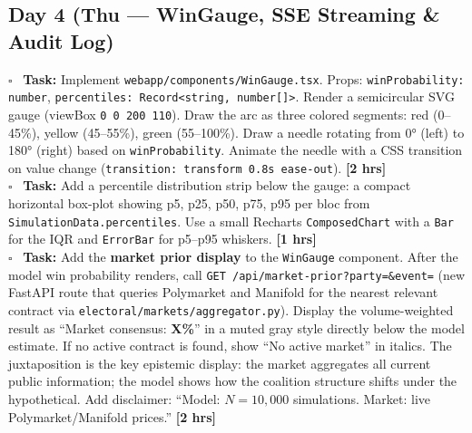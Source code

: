 \documentclass[11pt]{article}
\newcommand{\hrs}[1]{\textbf{[#1 hrs]}}
\newcommand{\dayhead}[2]{%
  \subsection*{Day #1 \normalfont\small\color{codegray}(#2)}}
\newcommand{\task}[2]{%
  \noindent\textbf{Task:} #1 \hfill \hrs{#2}\\}
\newcommand{\done}{\textcolor{sectionblue}{$\square$}\ }
\begin{document}
\dayhead{4}{Thu --- WinGauge, SSE Streaming \& Audit Log}

\begin{taskbox}
\done \task{Implement \texttt{webapp/components/WinGauge.tsx}. Props:
  \texttt{winProbability: number}, \texttt{percentiles: Record<string,
  number[]>}. Render a semicircular SVG gauge (viewBox \texttt{0 0 200 110}).
  Draw the arc as three colored segments: red (0--45\%), yellow (45--55\%),
  green (55--100\%). Draw a needle rotating from 0° (left) to 180° (right)
  based on \texttt{winProbability}. Animate the needle with a CSS transition
  on value change (\texttt{transition: transform 0.8s ease-out}).}{2}

\done \task{Add a percentile distribution strip below the gauge: a compact
  horizontal box-plot showing p5, p25, p50, p75, p95 per bloc from
  \texttt{SimulationData.percentiles}. Use a small Recharts
  \texttt{ComposedChart} with a \texttt{Bar} for the IQR and
  \texttt{ErrorBar} for p5--p95 whiskers.}{1}

\done \task{Add the \textbf{market prior display} to the \texttt{WinGauge}
  component. After the model win probability renders, call
  \texttt{GET /api/market-prior?party=\&event=} (new FastAPI route that
  queries Polymarket and Manifold for the nearest relevant contract via
  \texttt{electoral/markets/aggregator.py}). Display the volume-weighted
  result as ``Market consensus: \textbf{X\%}'' in a muted gray style
  directly below the model estimate. If no active contract is found,
  show ``No active market'' in italics. The juxtaposition is the key
  epistemic display: the market aggregates all current public information;
  the model shows how the coalition structure shifts under the hypothetical.
  Add disclaimer: ``Model: $N=10{,}000$ simulations. Market: live
  Polymarket/Manifold prices.''}{2}


\end{taskbox}
\end{document}
